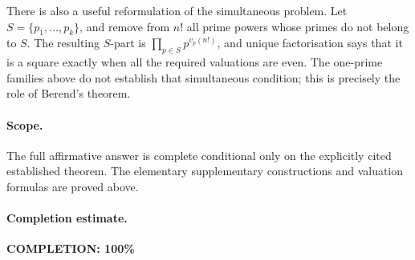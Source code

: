 There is also a useful reformulation of the simultaneous problem.
Let \(S=\{p_1,\ldots,p_k\}\), and remove from \(n!\) all prime powers
whose primes do not belong to \(S\). The resulting \(S\)-part is
\(\prod_{p\in S}p^{v_p(n!)}\), and unique factorisation says that it
is a square exactly when all the required valuations are even.
The one-prime families above do not establish that simultaneous
condition; this is precisely the role of Berend's theorem.

\paragraph{Scope.}
The full affirmative answer is complete conditional only on the
explicitly cited established theorem. The elementary supplementary
constructions and valuation formulas are proved above.

\paragraph{Completion estimate.}
\textbf{COMPLETION: 100\%}
